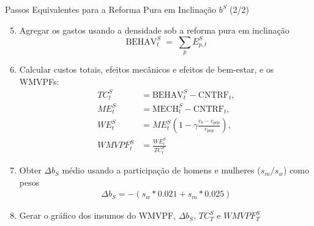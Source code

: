 \begin{frame}{Passos Equivalentes para a Reforma Pura em Inclinação $b^{S}$ (2/2)}
\begin{enumerate}
    \setcounter{enumi}{4}
    
    \item Agregar os {gastos} usando a densidade sob a reforma pura em inclinação
    \[
        \text{BEHAV}^{S}_t
        \;=\;
        \sum_{p}
        {E^{S}_{p,t}
        }
    \]
    
    \item Calcular custos totais, efeitos mecânicos e efeitos de bem-estar, e os WMVPFs:
    \begin{align*}
        TC^S_t &= \text{BEHAV}_t^{S} - \text{CNTRF}_t, \\
        ME^S_t &= \text{MECH}_t^{S} - \text{CNTRF}_t, \\
        WE^S_t &= ME^S_t \left(1-\gamma \frac{c_b - c_{pop}}{c_{pop}}\right), \\
        WMVPF_t^S &= \frac{WE^S_t}{TC^S_t}
    \end{align*}
    
    \item Obter $\Delta b_S$ médio usando a participação de homens e mulheres ($s_m/s_w$) como pesos
    \begin{align*}
        \Delta b_S = -(s_w*0.021+s_m*0.025)
    \end{align*}
    
    \item Gerar o gráfico dos insumos do WMVPF, $\Delta b_S$, $TC_T^S$ e $WMVPF_T^S$
\end{enumerate}
\end{frame}

